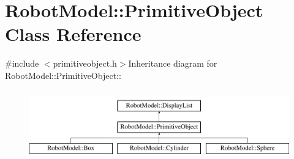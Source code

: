 \hypertarget{class_robot_model_1_1_primitive_object}{
\section{RobotModel::PrimitiveObject Class Reference}
\label{class_robot_model_1_1_primitive_object}
}


{\ttfamily \#include $<$primitiveobject.h$>$}Inheritance diagram for RobotModel::PrimitiveObject::\begin{figure}[H]
\begin{center}
\leavevmode
\includegraphics[height=3cm]{class_robot_model_1_1_primitive_object}
\end{center}
\end{figure}
